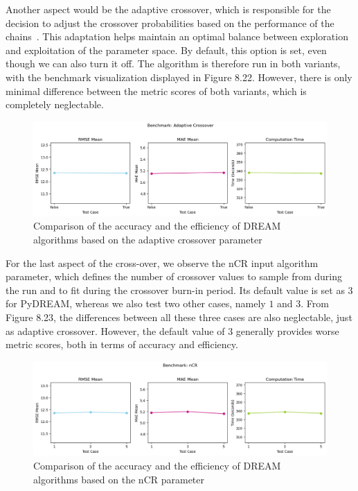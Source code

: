 Another aspect would be the adaptive crossover, which is responsible for the decision to adjust the crossover probabilities based on the performance of the chains~\cite{dream}. This adaptation helps maintain an optimal balance between exploration and exploitation of the parameter space. By default, this option is set, even though we can also turn it off. The algorithm is therefore run in both variants, with the benchmark visualization displayed in Figure 8.22. However, there is only minimal difference between the metric scores of both variants, which is completely neglectable. 
\begin{figure}[H]
    \centering
    \includegraphics[width=1\textwidth]{figures/dream/adaptive_crossover.png}
    \captionsetup{width=.8\textwidth}
    \caption{Comparison of the accuracy and the efficiency of DREAM algorithms based on the adaptive crossover parameter}
    \label{fig:enter-label}
\end{figure}

For the last aspect of the cross-over, we observe the nCR input algorithm parameter, which defines the number of crossover values to sample from during the run and to fit during the crossover burn-in period. Its default value is set as $3$ for PyDREAM, whereas we also test two other cases, namely $1$ and $3$. From Figure 8.23, the differences between all these three cases are also neglectable, just as adaptive crossover. However, the default value of $3$ generally provides worse metric scores, both in terms of accuracy and efficiency.
\begin{figure}[H]
    \centering
    \includegraphics[width=1\textwidth]{figures/dream/nCR.png}
    \captionsetup{width=.8\textwidth}
    \caption{Comparison of the accuracy and the efficiency of DREAM algorithms based on the nCR parameter}
    \label{fig:enter-label}
\end{figure}

